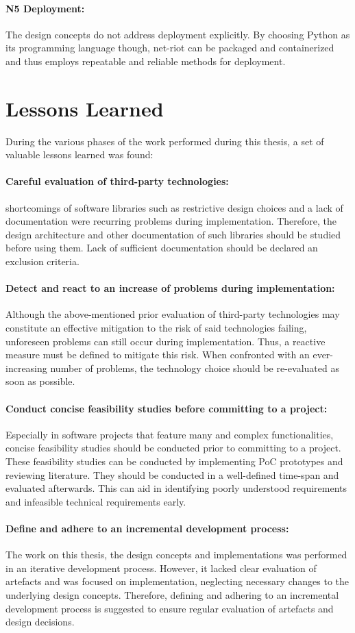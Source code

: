 \paragraph{N5 Deployment:} The design concepts do not address deployment explicitly. By choosing Python as its programming language though, net-riot can be packaged and containerized and thus employs repeatable and reliable methods for deployment.

\section{Lessons Learned}
\label{sec:pm-lessons-learned}
During the various phases of the work performed during this thesis, a set of valuable lessons learned was found:
\paragraph{Careful evaluation of third-party technologies:} shortcomings of software libraries such as restrictive design choices and a lack of documentation were recurring problems during implementation. Therefore, the design architecture and other documentation of such libraries should be studied before using them. Lack of sufficient documentation should be declared an exclusion criteria. 
\paragraph{Detect and react to an increase of problems during implementation:} Although the above-mentioned prior evaluation of third-party technologies may constitute an effective mitigation to the risk of said technologies failing, unforeseen problems can still occur during implementation. Thus, a reactive measure must be defined to mitigate this risk. When confronted with an ever-increasing number of problems, the technology choice should be re-evaluated as soon as possible.
\paragraph{Conduct concise feasibility studies before committing to a project:} Especially in software projects that feature many and complex functionalities, concise feasibility studies should be conducted prior to committing to a project. These feasibility studies can be conducted by implementing \ac{PoC} prototypes and reviewing literature. They should be conducted in a well-defined time-span and  evaluated afterwards. This can aid in identifying poorly understood requirements and infeasible technical requirements early.  
\paragraph{Define and adhere to an incremental development process:} The work on this thesis, the design concepts and implementations was performed in an iterative development process. However, it lacked clear evaluation of artefacts and was focused on implementation, neglecting necessary changes to the underlying design concepts. Therefore, defining and adhering to an incremental development process is suggested to ensure regular evaluation of artefacts and design decisions.